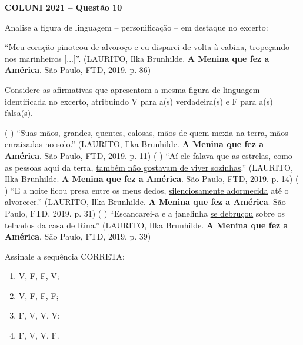\textbf{COLUNI 2021 -- Questão 10}\par\medskip Analise a figura de linguagem – personificação – em destaque no excerto:

\par

“\underline{Meu coração pinoteou de alvoroço} e eu disparei de volta à cabina, tropeçando nos marinheiros [...]”. (LAURITO, Ilka Brunhilde. \textbf{A Menina que fez a América}. São Paulo, FTD, 2019. p. 86)

\par

Considere as afirmativas que apresentam a mesma figura de linguagem identificada no excerto, atribuindo V para a(s) verdadeira(s) e F para a(s) falsa(s).

\par

( ) “Suas mãos, grandes, quentes, calosas, mãos de quem mexia na terra, \underline{mãos enraizadas no solo}.” (LAURITO, Ilka Brunhilde. \textbf{A Menina que fez a América}. São Paulo, FTD, 2019. p. 11) ( ) “Aí ele falava que \underline{as estrelas}, como as pessoas aqui da terra, \underline{também não gostavam de viver sozinhas}.” (LAURITO, Ilka Brunhilde. \textbf{A Menina que fez a América}. São Paulo, FTD, 2019. p. 14) ( ) “E a noite ficou presa entre os meus dedos, \underline{silenciosamente adormecida} até o alvorecer.” (LAURITO, Ilka Brunhilde. \textbf{A Menina que fez a América}. São Paulo, FTD, 2019. p. 31) ( ) “Escancarei-a e a janelinha \underline{se debruçou} sobre os telhados da casa de Rina.” (LAURITO, Ilka Brunhilde. \textbf{A Menina que fez a América}. São Paulo, FTD, 2019. p. 39)

\par

Assinale a sequência CORRETA:\begin{enumerate}
\item V, F, F, V;
\item V, F, F, F;
\item F, V, V, V;
\item F, V, V, F.

\end{enumerate}

